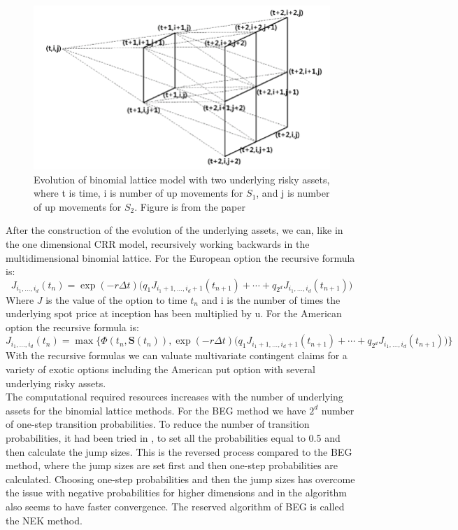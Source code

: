 \begin{figure}[th]
\centering
\includegraphics[width=\textwidth]{Figures/Three-dimensional-binomial-lattice.png}
\decoRule
\caption[Three Dimensional Binomial Lattice]{Evolution of binomial lattice model with two underlying risky assets, where t is time, i is number of up movements for $S_1$, and j is number of up movements for $S_2$. Figure is from the paper \parencite{KIM}}
\label{fig:threeDimLattice}
\end{figure}

After the construction of the evolution of the underlying assets, we can, like in the one dimensional CRR model, recursively working backwards in the multidimensional binomial lattice. For the European option the recursive formula is:
$$J_{i_1,\ldots, i_d}(t_n)=\exp(-r\Delta t) \bigg(q_1 J_{i_1+1,\ldots, i_d +1}(t_{n+1}) + \cdots + q_{2^d} J_{i_1,\ldots, i_d}(t_{n+1}) \bigg)$$
Where $J$ is the value of the option to time $t_n$ and i is the number of times the underlying spot price at inception has been multiplied by u. For the American option the recursive formula is:
$$J_{i_1,\ldots, i_d}(t_n)=\max\{\Phi(t_n,\bm{S}(t_n)), \exp(-r\Delta t) \bigg(q_1 J_{i_1+1,\ldots, i_d +1}(t_{n+1}) + \cdots + q_{2^d} J_{i_1,\ldots, i_d}(t_{n+1}) \bigg)\}$$
With the recursive formulas we can valuate multivariate contingent claims for a variety of exotic options including the American put option with several underlying risky assets. \\

The computational required resources increases with the number of underlying assets for the binomial lattice methods. For the BEG method we have $2^d$ number of one-step transition probabilities. To reduce the number of transition probabilities, it had been tried in \parencite{NEK}, to set all the probabilities equal to 0.5 and then calculate the jump sizes. This is the reversed process compared to the BEG method, where the jump sizes are set first and then one-step probabilities are calculated. Choosing one-step probabilities and then the jump sizes has overcome the issue with negative probabilities for higher dimensions and in \parencite{NEK} the algorithm also seems to have faster convergence. The reserved algorithm of BEG is called the NEK method.\\

